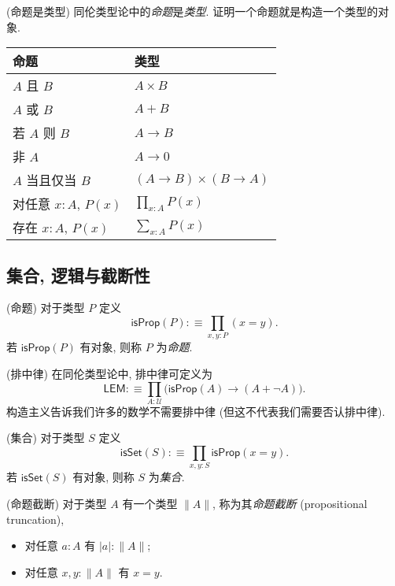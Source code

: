 \begin{definition}
	{(命题是类型)}
	同伦类型论中的\emph{命题}是\emph{类型}.
	证明一个命题就是构造一个类型的对象.
	\begin{center}
		\begin{tabular}{ll}
			命题 & 类型 \\
			\hline
			$A$ 且 $B$ & $A\times B$ \\
			$A$ 或 $B$ & $A+B$\\
			若 $A$ 则 $B$ & $A\to B$\\
			非 $A$ & $A\to 0$\\
			$A$ 当且仅当 $B$ & $(A\to B)\times (B\to A)$\\
			对任意 $x:A$, $P(x)$ & $\prod_{x:A}P(x)$\\
			存在 $x:A$, $P(x)$ & $\sum_{x : A} P(x)$
		\end{tabular}
	\end{center}
\end{definition}

\subsection{集合, 逻辑与截断性}

\newcommand{\isprop}{\mathsf{isProp}}
\newcommand{\isset}{\mathsf{isSet}}
\newcommand{\iscontr}{\mathsf{isContr}}

\begin{definition}
	{(命题)}
	对于类型 $P$ 定义
	\[
	\isprop(P) :\equiv \prod_{x,y : P} (x=y).
	\]
	若 $\isprop(P)$ 有对象, 则称 $P$ 为\emph{命题}.
\end{definition}

\begin{remark}
	{(排中律)}
	在同伦类型论中, 排中律可定义为
	\[
	\mathsf {LEM} :\equiv \prod_{A : \mathcal U}\big(
	\isprop(A) \to (A + \neg A)
	\big).
	\]
	构造主义告诉我们许多的数学不需要排中律 (但这不代表我们需要否认排中律).
\end{remark}

\begin{definition}
	{(集合)}
	对于类型 $S$ 定义
	\[
	\isset(S) :\equiv \prod_{x,y : S}\isprop(x=y).
	\]
	若 $\isset(S)$ 有对象, 则称 $S$ 为\emph{集合}.
\end{definition}

\begin{definition}
	{(命题截断)}
	对于类型 $A$ 有一个类型 $\|A\|$, 称为其\emph{命题截断} (propositional truncation),
	\begin{itemize}
		\item 对任意 $a:A$ 有 $|a|:\|A\|$;
		\item 对任意 $x,y:\|A\|$ 有 $x=y$.
	\end{itemize}
\end{definition}

